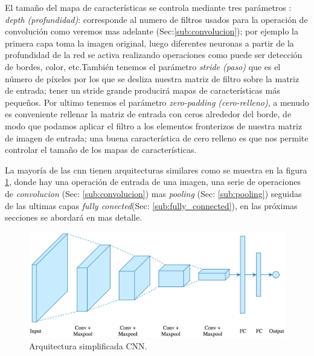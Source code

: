 El tamaño del mapa de características se controla mediante tres parámetros \citep{cnnsarticle}: \textit{depth (profundidad)}: corresponde al numero de filtros usados para la operación de convolución como veremos mas adelante (Sec:\ref{sub:convolucion}); por ejemplo la primera capa toma la imagen original, luego diferentes neuronas a partir de la profundidad de la red se activa realizando operaciones como puede ser detección de bordes, color, etc.También tenemos el parámetro \textit{stride (paso)} que es el número de píxeles por los que se desliza nuestra matriz de filtro sobre la matriz de entrada; tener un stride grande producirá mapas de características más pequeños. Por ultimo tenemos el parámetro \textit{zero-padding (cero-relleno)}, a menudo es conveniente rellenar la matriz de entrada con ceros alrededor del borde, de modo que podamos aplicar el filtro a los elementos fronterizos de nuestra matriz de imagen de entrada; una buena característica de cero relleno es que nos permite controlar el tamaño de los mapas de características.

La mayoría de las \ac{cnn} tienen arquitecturas similares como se muestra en la figura \ref{Fig:cnn_network}, donde hay una operación de entrada de una imagen, una serie de operaciones de  \textit{convolucion} (Sec: \ref{sub:convolucion}) mas  \textit{pooling} (Sec: \ref{sub:pooling}) seguidas de las ultimas capas \textit{fully conected}(Sec: \ref{sub:fully_connected}), en las próximas secciones se abordará en mas detalle. 

\begin{figure}[H]\centering
  \includegraphics[scale=0.2,keepaspectratio=true,clip=true]{imagenes/MarcoTeorico/cnn_intuition.png}
  \caption{Arquitectura simplificada CNN.}
  \label{Fig:cnn_network}
\end{figure}





